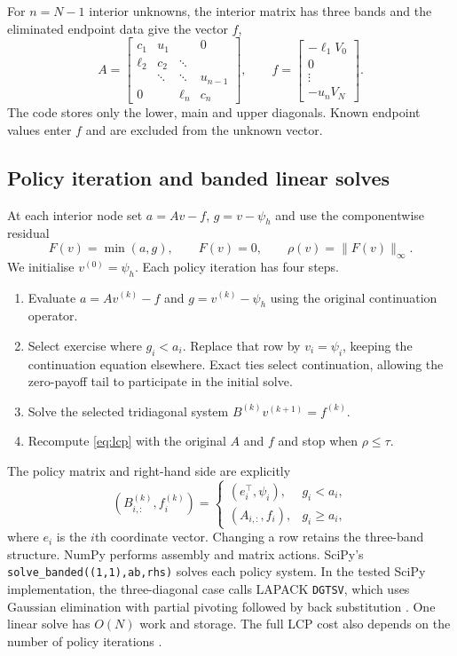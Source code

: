 \documentclass[11pt,a4paper]{article}
\numberwithin{equation}{section}
\begin{document}
For $n=N-1$ interior unknowns, the interior matrix has three bands and the eliminated endpoint data
give the vector $f$,
\begin{equation}\label{eq:matrix}
 A=\begin{bmatrix}
 c_1&u_1&&0\\
 \ell_2&c_2&\ddots&\\
 &\ddots&\ddots&u_{n-1}\\
 0&&\ell_n&c_n
 \end{bmatrix},\qquad
 f=\begin{bmatrix}-\ell_1V_0\\0\\\vdots\\-u_nV_N\end{bmatrix}.
\end{equation}
The code stores only the lower, main and upper diagonals. Known endpoint
values enter $f$ and are excluded from the unknown vector.

\subsection{Policy iteration and banded linear solves}\label{sec:policy}
At each interior node set $a=Av-f$, $g=v-\psi_h$ and use the componentwise
residual
\begin{equation}\label{eq:lcp}
  F(v)=\min(a,g),\qquad F(v)=0,\qquad
  \rho(v)=\|F(v)\|_\infty.
\end{equation}
We initialise $v^{(0)}=\psi_h$. Each policy iteration has four steps.
\begin{enumerate}
\item Evaluate $a=Av^{(k)}-f$ and $g=v^{(k)}-\psi_h$ using the original
      continuation operator.
\item Select exercise where $g_i<a_i$. Replace that row by
      $v_i=\psi_i$, keeping the continuation equation elsewhere.
      Exact ties select continuation, allowing the zero-payoff tail to
      participate in the initial solve.
\item Solve the selected tridiagonal system $B^{(k)}v^{(k+1)}=f^{(k)}$.
\item Recompute \eqref{eq:lcp} with the original $A$ and $f$ and stop
      when $\rho\le\tau$.
\end{enumerate}
The policy matrix and right-hand side are explicitly
\begin{equation}\label{eq:policy-rows}
 (B^{(k)}_{i,:},f^{(k)}_i)=
 \begin{cases}
  (e_i^\top,\psi_i), & g_i<a_i,\\
  (A_{i,:},f_i), & g_i\ge a_i,
 \end{cases}
\end{equation}
where $e_i$ is the $i$th coordinate vector. Changing a row retains the
three-band structure. NumPy performs assembly and matrix actions. SciPy's
\texttt{solve\_banded((1,1),ab,rhs)} solves each policy system.
In the tested SciPy implementation, the three-diagonal case calls
LAPACK \texttt{DGTSV}, which uses Gaussian elimination with partial
pivoting followed by back substitution \cite{lapack}.
One linear solve has $O(N)$ work and storage. The full LCP cost also
depends on the number of policy iterations \cite{rw}.
\end{document}
